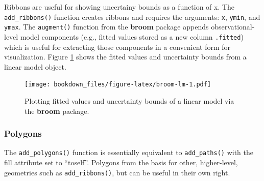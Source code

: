 \documentclass[12pt,]{isuthesis}
\newenvironment{Shaded}{\begin{snugshade}}{\end{snugshade}}
\newcommand{\KeywordTok}[1]{\textcolor[rgb]{0.13,0.29,0.53}{\textbf{{#1}}}}
\newcommand{\DataTypeTok}[1]{\textcolor[rgb]{0.13,0.29,0.53}{{#1}}}
\newcommand{\FloatTok}[1]{\textcolor[rgb]{0.00,0.00,0.81}{{#1}}}
\newcommand{\StringTok}[1]{\textcolor[rgb]{0.31,0.60,0.02}{{#1}}}
\newcommand{\OtherTok}[1]{\textcolor[rgb]{0.56,0.35,0.01}{{#1}}}
\newcommand{\NormalTok}[1]{{#1}}
\begin{document}
Ribbons are useful for showing uncertainy bounds as a function of x. The
\texttt{add\_ribbons()} function creates ribbons and requires the
arguments: \texttt{x}, \texttt{ymin}, and \texttt{ymax}. The
\texttt{augment()} function from the \textbf{broom} package appends
observational-level model components (e.g., fitted values stored as a
new column \texttt{.fitted}) which is useful for extracting those
components in a convenient form for visualization. Figure
\ref{fig:broom-lm} shows the fitted values and uncertainty bounds from a
linear model object.

\begin{Shaded}
\end{Shaded}

\begin{figure}[htbp]
\centering
\texttt{[image: bookdown\_files/figure-latex/broom-lm-1.pdf]}
\caption{\label{fig:broom-lm}Plotting fitted values and uncertainty bounds
of a linear model via the \textbf{broom} package.}
\end{figure}

\hypertarget{polygons}{\subsubsection{Polygons}\label{polygons}}

The \texttt{add\_polygons()} function is essentially equivalent to
\texttt{add\_paths()} with the
\href{https://plot.ly/r/reference/\#scatter-fill}{fill} attribute set to
``toself''. Polygons from the basis for other, higher-level, geometries
such as \texttt{add\_ribbons()}, but can be useful in their own right.
\end{document}
